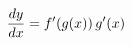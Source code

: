 \documentclass[preview]{standalone}
\begin{document}
\begin{align*}
\special{dvisvgm:raw <g id='unique000'>}\frac{dy}{dx} = f'(g(x))\, g'(x)\special{dvisvgm:raw </g>}
\end{align*}
\end{document}
